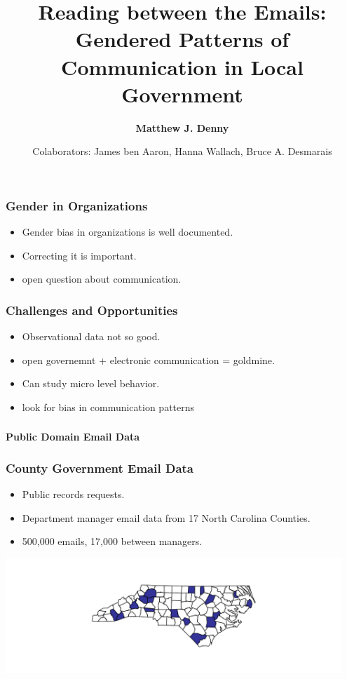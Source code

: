 \documentclass[xcolor={table}]{beamer}
\title{Reading between the Emails: Gendered Patterns of Communication in Local Government}
\author{\Large\textbf{Matthew J. Denny}}
\institute{\large Penn State University --- 
 \texttt{mzd5530@psu.edu}\\
 \color{blue}\texttt{www.mjdenny.com}\\ 
 \texttt{@MatthewJDenny}
}
\date{Colaborators: James ben Aaron, Hanna Wallach, Bruce A. Desmarais}
\begin{document}
\begin{frame}
  \titlepage
\end{frame}


\begin{frame}\frametitle{Gender in Organizations}
	\begin{itemize}
		\item Gender bias in organizations is well documented.
		\item Correcting it is important.
		\item open question about communication.
	\end{itemize}
\end{frame}


\begin{frame}\frametitle{Challenges and Opportunities}
	\begin{itemize}
		\item Observational data not so good.
		\item open governemnt + electronic communication = goldmine.
		\item Can study micro level behavior.
		\item look for bias in communication patterns
	\end{itemize}
	
\end{frame}

\begin{frame}\frametitle{}
	\begin{center}
		\Huge\textbf{Public Domain Email Data}
	\end{center}
\end{frame}

\begin{frame}\frametitle{County Government Email Data}
	\large
	\begin{itemize}
		\item Public records requests.
		\vspace*{.1in}
		\item Department manager email data from 17 North Carolina Counties.
		\vspace*{.1in}
		\item 500,000 emails, 17,000 between managers.
		\vspace*{.1in}
	\end{itemize}
	\centering
	\includegraphics[width=0.95\textwidth]{images/County_Map.pdf}
\end{frame}
\end{document}
